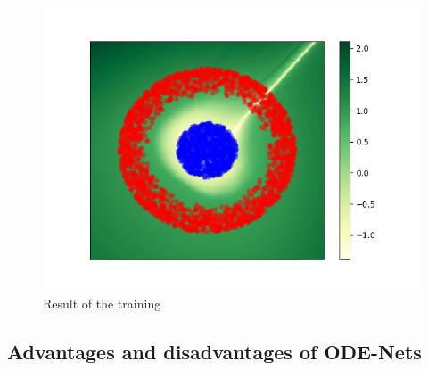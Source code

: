 \documentclass[10pt,a4paper]{article}
\theoremstyle{definition}
\theoremstyle{definition}
\theoremstyle{definition}
\begin{document}
\begin{figure}[!h]
\center
\includegraphics[scale=0.6]{class_spheres.png}
\caption{Result of the training}
\label{class}
\end{figure}

\newpage

\subsection{Advantages and disadvantages of ODE-Nets}
\end{document}
